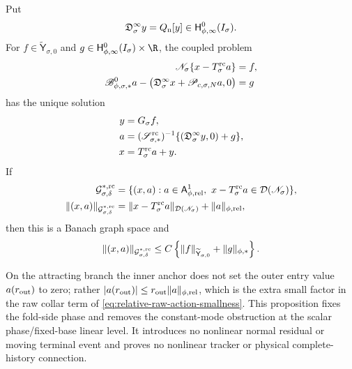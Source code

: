 \begin{proposition}
Put
\[
 \mathfrak D_\sigma^\infty y=Q_{\rm n}[y]
       \in\mathsf H_{\phi,\infty}^0(I_\sigma).
\]
For
\(f\in\widetilde{\mathsf Y}_{\sigma,0}\) and
\(g\in\mathsf H_{\phi,\infty}^0(I_\sigma)\times\R\), the coupled problem
\begin{align}
 \mathscr N_\sigma\{x-T_\sigma^{\rm rc}a\}&=f,\notag\\
 \mathscr B_{\phi,\sigma,*}^0a
  -\bigl(\mathfrak D_\sigma^\infty x
       +\mathscr P_{c,\sigma,N}a,0\bigr)&=g       \label{eq:inner-anchored-coupled-block}
\end{align}
has the unique solution
\begin{align}
 y&=G_\sigma f,\notag\\
 a&=(\mathscr S_{\sigma,*}^{\rm rc})^{-1}
       \{(\mathfrak D_\sigma^\infty y,0)+g\},\notag\\
 x&=T_\sigma^{\rm rc}a+y.                         \label{eq:inner-anchored-schur-inverse}
\end{align}
If
\begin{align}
 \mathcal G_{\sigma,\delta}^{*,\rm rc}
 &=\{(x,a):a\in\mathsf A_{\phi,\mathrm{rel}}^1,\
       x-T_\sigma^{\rm rc}a\in\mathcal D(\mathscr N_\sigma)\},\notag\\
 \|(x,a)\|_{\mathcal G_{\sigma,\delta}^{*,\rm rc}}
 &=\|x-T_\sigma^{\rm rc}a\|_{\mathcal D(\mathscr N_\sigma)}
       +\|a\|_{\phi,\mathrm{rel}},                 \label{eq:inner-anchored-graph-norm}
\end{align}
then this is a Banach graph space and
\begin{equation}
 \|(x,a)\|_{\mathcal G_{\sigma,\delta}^{*,\rm rc}}
 \le C\left\{\|f\|_{\widetilde{\mathsf Y}_{\sigma,0}}
                    +\|g\|_{\phi,*}\right\}.       \label{eq:inner-anchored-schur-bound}
\end{equation}

On the attracting branch the inner anchor does not set the outer entry
value \(a(r_{\rm out})\) to zero; rather
\(|a(r_{\rm out})|\le r_{\rm out}\|a\|_{\phi,\mathrm{rel}}\), which is
the extra small factor in the raw collar term of
\cref{eq:relative-raw-action-smallness}.  This proposition fixes the
fold-side phase and removes the constant-mode obstruction at the scalar
phase/fixed-base linear level.  It introduces no nonlinear normal residual
or moving terminal event and proves no nonlinear tracker or physical
complete-history connection.
\end{proposition}


